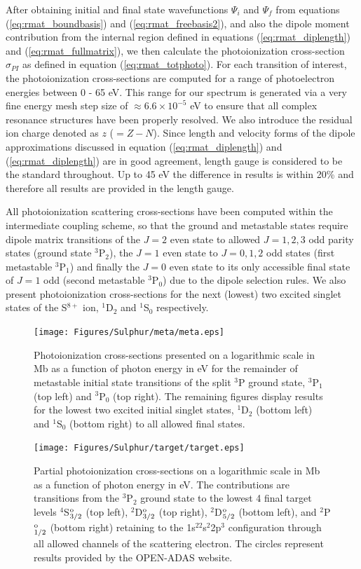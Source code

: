 After obtaining initial and final state wavefunctions $\Psi_i$ and $\Psi_f$ from equations (\ref{eq:rmat_boundbasis}) and (\ref{eq:rmat_freebasis2}), and also the dipole moment contribution from the internal region defined in equations (\ref{eq:rmat_diplength}) and (\ref{eq:rmat_fullmatrix}), we then calculate the photoionization cross-section $\sigma_{PI}$ as defined in equation (\ref{eq:rmat_totphoto}). For each transition of interest, the photoionization cross-sections are computed for a range of photoelectron energies between 0 - 65 eV. This range for our spectrum is generated via a very fine energy mesh step size of $\approx 6.6 \times 10^{-5}$ eV to ensure that all complex resonance structures have been properly resolved. We also introduce the residual ion charge denoted as $z$ ($=Z-N$). Since length and velocity forms of the dipole approximations discussed in equation (\ref{eq:rmat_diplength}) and (\ref{eq:rmat_diplength}) are in good agreement, length gauge is considered to be the standard throughout. Up to 45 eV the difference in results is within 20\% and therefore all results are provided in the length gauge.

All photoionization scattering cross-sections have been computed within the intermediate coupling scheme, so that the ground and metastable states require dipole matrix transitions of the $J=2$ even state to allowed $J=1,2,3$ odd parity states (ground state $^3$P$_2$), the $J=1$ even state to $J=0,1,2$ odd states (first metastable $^3$P$_1$) and finally the $J=0$ even state to its only accessible final state of $J=1$ odd (second metastable $^3$P$_0$) due to the dipole selection rules.  We also present photoionization cross-sections for the next (lowest) two excited singlet states of the S$^{8+}$ ion, $^1$D$_2$ and $^1$S$_0$ respectively.

%
\begin{figure}
\centering
\texttt{[image: Figures/Sulphur/meta/meta.eps]}
\caption{Photoionization cross-sections presented on a logarithmic scale in Mb as a function of photon energy in eV for the remainder of metastable initial state transitions of the split $^3$P ground state, $^3$P$_1$ (top left) and $^3$P$_0$ (top right). The remaining figures display results for the lowest two excited initial singlet states, $^1$D$_2$ (bottom left) and $^1$S$_0$ (bottom right) to all allowed final states. \label{fig:sul_meta}}
\end{figure}

%
\begin{figure}
\centering
\texttt{[image: Figures/Sulphur/target/target.eps]}
\caption{Partial photoionization cross-sections on a logarithmic scale in Mb as a function of photon energy in eV. The contributions are transitions from the $^3$P$_2$ ground state to the lowest 4 final target levels $^4$S$^{\rm{o}}_{3/2}$ (top left), $^2$D$^{\rm{o}}_{3/2}$ (top right), $^2$D$^{\rm{o}}_{5/2}$ (bottom left), and $^2$P$^{\rm{o}}_{1/2}$ (bottom right) retaining to the 1s$^22$s$^2$2p$^3$ configuration through all allowed channels of the scattering electron. The circles represent results provided by the OPEN-ADAS website. \label{fig:sul_target}}
\end{figure}

